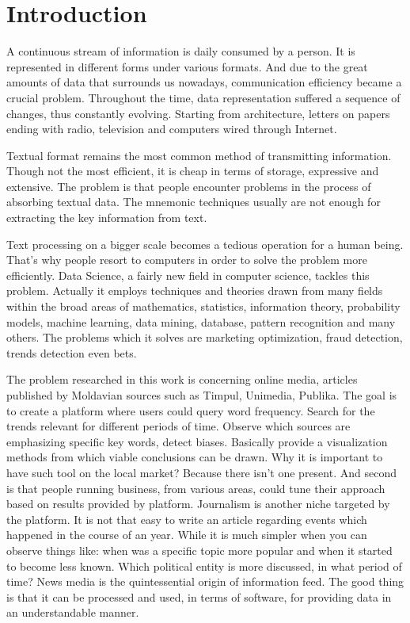 \section*{Introduction}
A continuous stream of information is daily consumed by a person. It is represented in different forms under various formats. And due to the great amounts of data that surrounds us nowadays, communication efficiency became a crucial problem. Throughout the time, data representation suffered a sequence of changes, thus constantly evolving. Starting from architecture, letters on papers ending with radio, television and computers wired through Internet.

Textual format remains the most common method of transmitting information. Though not the most efficient, it is cheap in terms of storage, expressive and extensive. The problem is that people encounter problems in the process of absorbing textual data. The mnemonic techniques usually are not enough for extracting the key information from text.

Text processing on a bigger scale becomes a tedious operation for a human being. That's why people resort to computers in order to solve the problem more efficiently. Data Science, a fairly new field in computer science, tackles this problem. Actually it employs techniques and theories drawn from many fields within the broad areas of mathematics, statistics, information theory, probability models, machine learning, data mining, database, pattern recognition and many others. The problems which it solves are marketing optimization, fraud detection, trends detection even bets.

The problem researched in this work is concerning online media, articles published by Moldavian sources such as Timpul, Unimedia, Publika. The goal is to create a platform where users could query word frequency. Search for the trends relevant for different periods of time. Observe which sources are emphasizing specific key words, detect biases. Basically provide a visualization methods from which viable conclusions can be drawn. Why it is important to have such tool on the local market? Because there isn't one present. And second is that people running business, from various areas, could tune their approach based on results provided by platform. Journalism is another niche targeted by the platform. It is not that easy to write an article regarding events which happened in the course of an year. While it is much simpler when you can observe things like: when was a specific topic more popular and when it started to become less known. Which political entity is more discussed, in what period of time? News media is the quintessential origin of information feed. The good thing is that it can be processed and used, in terms of software, for providing data in an understandable manner.

